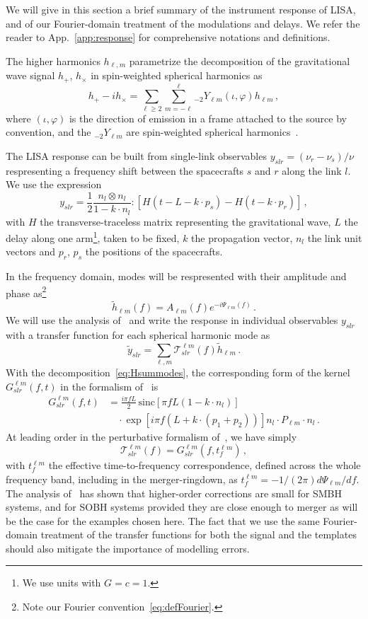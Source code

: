 \documentclass[aps,showpacs,twocolumn,prd,superscriptaddress,nofootinbib]{revtex4-1}
\newcommand{\be}{\begin{equation}}
\newcommand{\ee}{\end{equation}}
\newcommand\calT{{\mathcal{T}}}
\newcommand{\nn}{\nonumber}
\newcommand{\sinc}{\,\mathrm{sinc}}
\begin{document}
We will give in this section a brief summary of the instrument response of LISA, and of our Fourier-domain treatment of the modulations and delays. We refer the reader to App.~\ref{app:response} for comprehensive notations and definitions.

The higher harmonics $h_{\ell, m}$ parametrize the decomposition of the gravitational wave signal $h_{+}$, $h_{\times}$ in spin-weighted spherical harmonics as
\be\label{eq:hpcmodes}
	h_{+} - i h_{\times} = \sum_{\ell \geq 2} \sum_{m = -\ell}^{\ell} {}_{-2}Y_{\ell m} (\iota, \varphi) h_{\ell m} \,,
\ee
where $(\iota, \varphi)$ is the direction of emission in a frame attached to the source by convention, and the ${}_{-2}Y_{\ell m}$ are spin-weighted spherical harmonics~\cite{}.

The LISA response can be built from single-link observables $y_{slr} = (\nu_{r} - \nu_{s})/\nu$ respresenting a frequency shift between the spacecrafts $s$ and $r$ along the link $l$. We use the expression~\cite{}
\be\label{eq:defyslr}
	y_{slr} = \frac{1}{2} \frac{n_{l} \otimes n_{l}}{1 - k\cdot n_{l}} : \left[ H(t - L - k\cdot p_{s}) - H(t - k\cdot p_{r}) \right] \,,
\ee
with $H$ the transverse-traceless matrix representing the gravitational wave, $L$ the delay along one arm\footnote{We use units with $G=c=1$.}, taken to be fixed, $k$ the propagation vector, $n_{l}$ the link unit vectors and $p_{r}$, $p_{s}$ the positions of the spacecrafts.

In the frequency domain, modes will be respresented with their amplitude and phase as\footnote{Note our Fourier convention~\eqref{eq:defFourier}.}
\be\label{eq:hlmampphase}
	\tilde{h}_{\ell m} (f) = A_{\ell m} (f) e^{-i\Psi_{\ell m} (f)}\,.
\ee
We will use the analysis of~\cite{MB18} and write the response in individual observables $y_{slr}$ with a transfer function for each spherical harmonic mode as
\be
	\tilde{y}_{slr} = \sum_{\ell, m}\calT_{slr}^{\ell m}(f) \tilde{h}_{\ell m} \,.
\ee
With the decomposition~\eqref{eq:Hsummodes}, the corresponding form of the kernel $G^{\ell m}_{slr}(f, t)$ in the formalism of~\cite{MB18} is
\begin{align}\label{eq:Gslr}
	G_{slr}^{\ell m}(f,t) &= \frac{i \pi f L}{2} \sinc \left[ \pi f L\left(1-k\cdot n_{l} \right) \right] \nn\\
	& \quad \cdot \exp\left[ i \pi f \left( L + k\cdot \left( p_{1} + p_{2} \right) \right) \right]  n_{l} \cdot P_{\ell m} \cdot n_{l} \,.
\end{align}
At leading order in the perturbative formalism of~\cite{MB18}, we have simply
\be
	\calT_{slr}^{\ell m}(f) = G_{slr}^{\ell m}(f, t_{f}^{\ell m}) \,,
\ee
with $t_{f}^{\ell m}$ the effective time-to-frequency correspondence, defined across the whole frequency band, including in the merger-ringdown, as $t_{f}^{\ell m} = -1/(2\pi) d\Psi_{\ell m} / df$. The analysis of~\cite{} has shown that higher-order corrections are small for SMBH systems, and for SOBH systems provided they are close enough to merger as will be the case for the examples chosen here. The fact that we use the same Fourier-domain treatment of the transfer functions for both the signal and the templates should also mitigate the importance of modelling errors.
\end{document}
